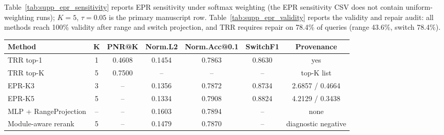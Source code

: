 \documentclass[journal,10pt]{IEEEtran}
\begin{document}
Table~\ref{tab:supp_epr_sensitivity} reports EPR sensitivity under softmax weighting (the EPR sensitivity CSV does not contain uniform-weighting runs); $K=5$, $\tau=0.05$ is the primary manuscript row. Table~\ref{tab:supp_epr_validity} reports the validity and repair audit: all methods reach 100\% validity after range and switch projection, and TRR requires repair on 78.4\% of queries (range 43.6\%, switch 78.4\%).

\clearpage





\clearpage

\begin{minipage}{\textwidth}
	\centering
	\label{tab:executable_neighborhood_supp}
	\footnotesize
	\begin{tabular}{lcccccc}
		\toprule
		\textbf{Method} & \textbf{K} & \textbf{PNR@K} & \textbf{Norm.L2} & \textbf{Norm.Acc@0.1} & \textbf{SwitchF1} & \textbf{Provenance} \\
		\midrule
		TRR top-1 & 1 & 0.4608 & 0.1454 & 0.7863 & 0.8630 & yes \\
		TRR top-K & 5 & 0.7500 & -- & -- & -- & top-K list \\
		EPR-K3 & 3 & -- & 0.1356 & 0.7872 & 0.8734 & 2.6857 / 0.4664 \\
		EPR-K5 & 5 & -- & 0.1334 & 0.7908 & 0.8824 & 4.2129 / 0.3438 \\
		MLP + RangeProjection & -- & -- & 0.1603 & 0.7894 & -- & none \\
		Module-aware rerank & 5 & -- & 0.1479 & 0.7870 & -- & diagnostic negative \\
		\bottomrule
	\end{tabular}
\end{minipage}
\end{document}
